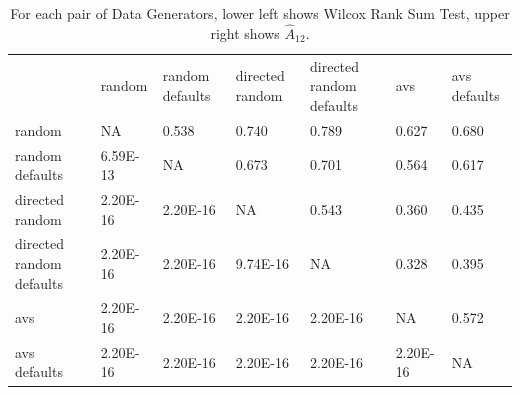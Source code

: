 \begin{table}[h]
\begin{tabular}{lllllll}
                         & random   & random defaults & directed random & directed random defaults & avs      & avs defaults \\
random                   & NA       & 0.538           & 0.740           & 0.789                    & 0.627    & 0.680        \\
random defaults          & 6.59E-13 & NA              & 0.673           & 0.701                    & 0.564    & 0.617        \\
directed random          & 2.20E-16 & 2.20E-16        & NA              & 0.543                    & 0.360    & 0.435        \\
directed random defaults & 2.20E-16 & 2.20E-16        & 9.74E-16        & NA                       & 0.328    & 0.395        \\
avs                      & 2.20E-16 & 2.20E-16        & 2.20E-16        & 2.20E-16                 & NA       & 0.572        \\
avs defaults             & 2.20E-16 & 2.20E-16        & 2.20E-16        & 2.20E-16                 & 2.20E-16 & NA          
\end{tabular}
\caption{For each pair of Data Generators, lower left shows Wilcox Rank
Sum Test, upper right shows $\hat{A}_{12}$.}
\label{tab:datas}
\end{table}

